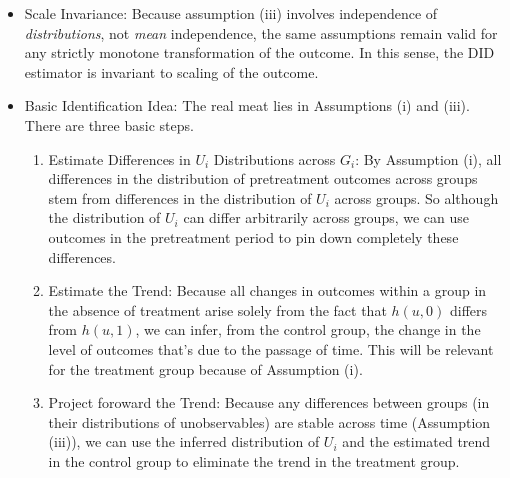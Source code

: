 \documentclass[12pt]{article}
\theoremstyle{plain}
\theoremstyle{definition}
\theoremstyle{remark}
\begin{document}
\begin{itemize}
  \item Scale Invariance:
    Because assumption (iii) involves independence of
    \emph{distributions}, not \emph{mean} independence, the same
    assumptions remain valid for any strictly monotone
    transformation of the outcome.  In this sense, the DID estimator
    is invariant to scaling of the outcome.
  \item Basic Identification Idea:
    The real meat lies in Assumptions (i) and (iii).
    There are three basic steps.
    \begin{enumerate}
      \item
        Estimate Differences in $U_i$ Distributions across $G_i$:
        By Assumption (i), all differences in the distribution of
        pretreatment outcomes across groups stem from differences in
        the distribution of $U_i$ across groups.
        So although the distribution of $U_i$ can differ arbitrarily
        across groups, we can use outcomes in the pretreatment
        period to pin down completely these differences.

      \item
        Estimate the Trend:
        Because all changes in outcomes within a group in the
        absence of treatment arise solely from the fact that
        $h(u,0)$ differs from $h(u,1)$, we can infer, from the
        control group, the change in the level of outcomes that's
        due to the passage of time.
        This will be relevant for the treatment group because of
        Assumption (i).

      \item
        Project foroward the Trend:
        Because any differences between groups (in their
        distributions of unobservables) are stable across time
        (Assumption (iii)), we can use the inferred distribution of
        $U_i$ and the estimated trend in the control group to
        eliminate the trend in the treatment group.
    \end{enumerate}
\end{itemize}

\clearpage
\end{document}
